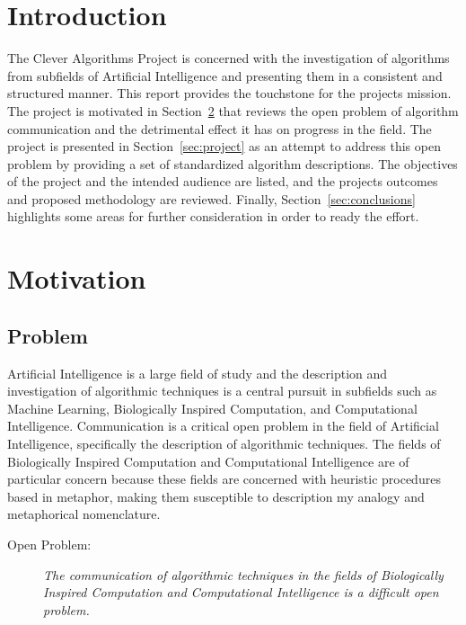 \documentclass[a4paper, 11pt]{article}
\begin{document}
\section{Introduction}
\label{sec:introduction}
The Clever Algorithms Project is concerned with the investigation of algorithms from subfields of Artificial Intelligence and presenting them in a consistent and structured manner. This report provides the touchstone for the projects mission.
The project is motivated in Section~\ref{sec:motivation} that reviews the open problem of algorithm communication and the detrimental effect it has on progress in the field. The project is presented in Section~\ref{sec:project} as an attempt to address this open problem by providing a set of standardized algorithm descriptions. The objectives of the project and the intended audience are listed, and the projects outcomes and proposed methodology are reviewed. Finally, Section~\ref{sec:conclusions} highlights some areas for further consideration in order to ready the effort.

\section{Motivation}
\label{sec:motivation}

\subsection{Problem}
Artificial Intelligence is a large field of study and the description and investigation of algorithmic techniques is a central pursuit in subfields such as Machine Learning, Biologically Inspired Computation, and Computational Intelligence. Communication is a critical open problem in the field of Artificial Intelligence, specifically the description of algorithmic techniques. The fields of Biologically Inspired Computation and Computational Intelligence are of particular concern because these fields are concerned with heuristic procedures based in metaphor, making them susceptible to description my analogy and metaphorical nomenclature.

\begin{description}
	\item[Open Problem:]\emph{The communication of algorithmic techniques in the fields of Biologically Inspired Computation and Computational Intelligence is a difficult open problem.}
\end{description}
\end{document}
